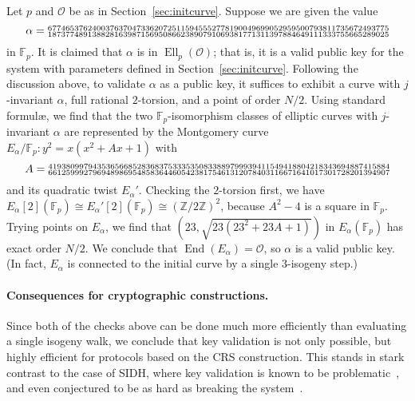 \documentclass{llncs}
\newcommand{\F}{\mathbb{F}}
\newcommand{\Z}{\mathbb{Z}}
\renewcommand{\O}{\mathcal{O}}
\DeclareMathOperator{\End}{End}
\DeclareMathOperator{\Ell}{Ell}
\begin{document}
\begin{example}
    Let $p$ and $\O$ be as in Section~\ref{sec:initcurve}.
    Suppose we are given the value
    \[
        \alpha = 
        \begin{subarray}{l}
            67746537624003763704733620725115945552778190049699052959500793811735672493775
            \\
            18737748913882816398715695086623890791069381771311397884649111333755665289025
        \end{subarray}
    \]
    in $\F_p$.  It is claimed that $\alpha$ is in $\Ell_p(\O)$;
    that is, it is a valid public key for the system with parameters
    defined in Section~\ref{sec:initcurve}.
    Following the discussion above,
    to validate $\alpha$ as a public key,
    it suffices to exhibit a curve with $j$-invariant $\alpha$,
    full rational $2$-torsion,
    and a point of order $N/2$.
    Using standard formul\ae{},
    we find that the two $\F_p$-isomorphism classes of elliptic curves
    with $j$-invariant $\alpha$
    are represented by the Montgomery curve
    $E_\alpha/\F_p: y^2 = x(x^2 + Ax + 1)$
    with
    \[
        A = 
        \begin{subarray}{l}
            41938099794353656685283683753335350833889799939411549418804218343694887415884
            \\
            66125999279694898695485836446054238175461312078403116671641017301728201394907
        \end{subarray}
    \]
    and its quadratic twist $E_\alpha'$.
    Checking the $2$-torsion first,
    we have $E_\alpha[2](\F_p) \cong E_\alpha'[2](\F_p) \cong (\Z/2\Z)^2$,
    because $A^2 - 4$ is a square in $\F_p$.
    Trying points on $E_\alpha$,
    we find that $(23,\sqrt{23(23^2 + 23A + 1)})$ in $E_\alpha(\F_p)$
    has exact order $N/2$.
    We conclude that $\End(E_\alpha) = \O$,
    so $\alpha$ is a valid public key.
    (In fact, $E_\alpha$ is connected to the initial curve
    by a single $3$-isogeny step.)
\end{example}

\paragraph{Consequences for cryptographic constructions.}
Since both of the checks above can be done much more efficiently 
than evaluating a single isogeny walk, 
we conclude that key validation is not only possible,
but highly efficient for protocols based on the CRS construction. 
This stands in stark contrast to the case of SIDH,
where key validation is known to be
problematic~\cite{galbraithsecurity}, and even conjectured to be as
hard as breaking the system~\cite{cryptoeprint:2018:336}.
\end{document}
